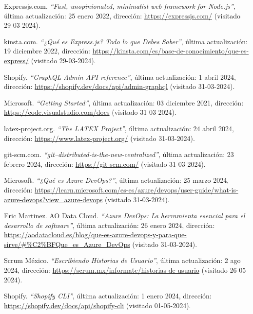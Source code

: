 \documentclass[11pt]{article}
\begin{document}
\begin{thebibliography}{100}
    Expressjs.com.
    \textit{``Fast, unopinionated, minimalist web framework for Node.js''}, última actualización: 25 enero 2022, dirección: \url{https://expressjs.com/} (visitado 29-03-2024).

    kinsta.com.
    \textit{``¿Qué es Express.js? Todo lo que Debes Saber''}, última actualización: 19 diciembre 2022, dirección: \url{https://kinsta.com/es/base-de-conocimiento/que-es-express/} (visitado 29-03-2024).
    
    Shopify.
    \textit{``GraphQL Admin API reference''}, última actualización: 1 abril 2024, dirección: \url{https://shopify.dev/docs/api/admin-graphql} (visitado 31-03-2024).

    Microsoft.
    \textit{``Getting Started''}, última actualización: 03 diciembre 2021, dirección: \url{https://code.visualstudio.com/docs} (visitado 31-03-2024).

    latex-project.org.
    \textit{``The LATEX Project''}, última actualización: 24 abril 2024, dirección: \url{https://www.latex-project.org/} (visitado 31-03-2024).

    git-scm.com.
    \textit{``git--distributed-is-the-new-centralized''}, última actualización: 23 febrero 2024, dirección: \url{https://git-scm.com/} (visitado 31-03-2024).

    Microsoft.
    \textit{``¿Qué es Azure DevOps?''}, última actualización: 25 marzo 2024, dirección: \url{https://learn.microsoft.com/es-es/azure/devops/user-guide/what-is-azure-devops?view=azure-devops} (visitado 31-03-2024).

    Eric Martinez. AO Data Cloud.
    \textit{``Azure DevOps: La herramienta esencial para el desarrollo de software''}, última actualización: 26 enero 2024, dirección: \url{https://aodatacloud.es/blog/que-es-azure-devops-y-para-que-sirve/#%C2%BFQue_es_Azure_DevOps} (visitado 31-03-2024).

    Scrum México.
    \textit{``Escribiendo Historias de Usuario''}, última actualización: 2 ago 2024, dirección: \url{https://scrum.mx/informate/historias-de-usuario} (visitado 26-05-2024).

    Shopify.
    \textit{``Shopify CLI''}, última actualización: 1 enero 2024, dirección: \url{https://shopify.dev/docs/api/shopify-cli} (visitado 01-05-2024).


\end{thebibliography}
\end{document}
